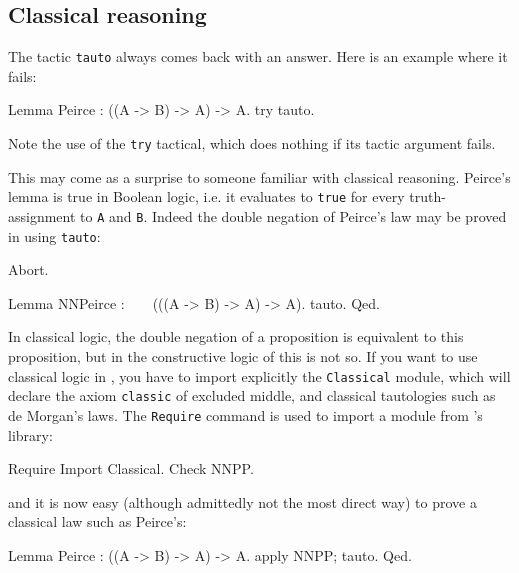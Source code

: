 \documentclass[11pt,a4paper]{book}
\begin{document}
\subsection{Classical reasoning}

The tactic \verb:tauto: always comes back with an answer. Here is an example where it 
fails:
\begin{coq_example}
Lemma Peirce : ((A -> B) -> A) -> A.
try tauto.
\end{coq_example}

Note the use of the \verb:try: tactical, which does nothing if its tactic
argument fails.

This may come as a surprise to someone familiar with classical reasoning. 
Peirce's lemma is true in Boolean logic, i.e. it evaluates to \verb:true: for 
every truth-assignment to \verb:A: and \verb:B:. Indeed the double negation
of Peirce's law may be proved in \Coq{} using \verb:tauto::
\begin{coq_eval}
Abort.
\end{coq_eval}
\begin{coq_example}
Lemma NNPeirce : ~ ~ (((A -> B) -> A) -> A).
tauto.
Qed.
\end{coq_example}

In classical logic, the double negation of a proposition is equivalent to this 
proposition, but in the constructive logic of \Coq{} this is not so. If you
want to use classical logic in \Coq, you have to import explicitly the
\verb:Classical: module, which will declare the axiom \verb:classic:
of excluded middle, and classical tautologies such as de Morgan's laws.
The \verb:Require: command is used to import a module from \Coq's library:
\begin{coq_example}
Require Import Classical.
Check NNPP.
\end{coq_example}

and it is now easy (although admittedly not the most direct way) to prove
a classical law such as Peirce's:
\begin{coq_example}
Lemma Peirce : ((A -> B) -> A) -> A.
apply NNPP; tauto.
Qed.
\end{coq_example}
\end{document}
